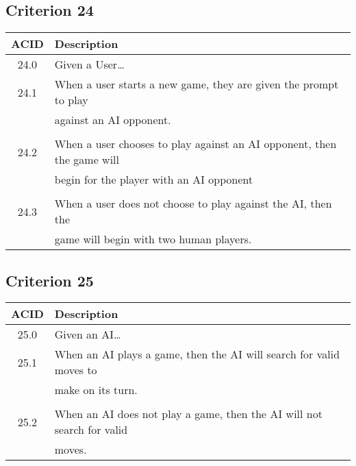 \documentclass[11pt]{article}
\begin{document}
\subsection{Criterion 24}
\label{sec:orga442703}
\begin{center}
\begin{tabular}{|c|p{12.0cm}|}
ACID & Description\\
\hline
24.0 & Given a User\ldots{}\\
\hline
24.1 & When a user starts a new game, they are given the prompt to play\\
 & against an AI opponent.\\
 & \\
24.2 & When a user chooses to play against an AI opponent, then the game will\\
 & begin for the player with an AI opponent\\
 & \\
24.3 & When a user does not choose to play against the AI, then the\\
 & game will begin with two human players.\\
\end{tabular}
\end{center}


\subsection{Criterion 25}
\label{sec:org67d882b}
\begin{center}
\begin{tabular}{|c|p{12.0cm}|}
ACID & Description\\
\hline
25.0 & Given an AI\ldots{}\\
\hline
25.1 & When an AI plays a game, then the AI will search for valid moves to\\
 & make on its turn.\\
 & \\
25.2 & When an AI does not play a game, then the AI will not search for valid\\
 & moves.\\
\end{tabular}
\end{center}
\end{document}

